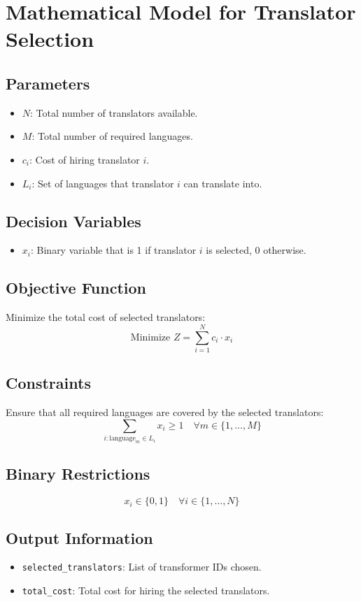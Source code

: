 \documentclass{article}
\begin{document}
\section*{Mathematical Model for Translator Selection}

\subsection*{Parameters}
\begin{itemize}
    \item $N$: Total number of translators available.
    \item $M$: Total number of required languages.
    \item $c_i$: Cost of hiring translator $i$.
    \item $L_i$: Set of languages that translator $i$ can translate into.
\end{itemize}

\subsection*{Decision Variables}
\begin{itemize}
    \item $x_i$: Binary variable that is 1 if translator $i$ is selected, 0 otherwise.
\end{itemize}

\subsection*{Objective Function}
Minimize the total cost of selected translators:
\[
\text{Minimize } Z = \sum_{i=1}^{N} c_i \cdot x_i
\]

\subsection*{Constraints}
Ensure that all required languages are covered by the selected translators:
\[
\sum_{i: \text{language}_m \in L_i} x_i \geq 1 \quad \forall m \in \{1, \ldots, M\}
\]

\subsection*{Binary Restrictions}
\[
x_i \in \{0, 1\} \quad \forall i \in \{1, \ldots, N\}
\]

\subsection*{Output Information}
\begin{itemize}
    \item \texttt{selected\_translators}: List of transformer IDs chosen.
    \item \texttt{total\_cost}: Total cost for hiring the selected translators.
\end{itemize}
\end{document}

